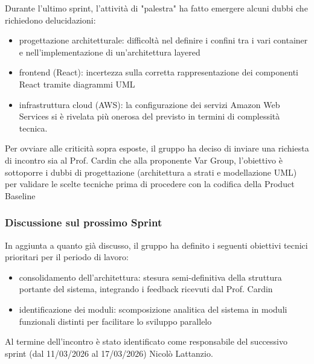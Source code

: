 \documentclass[a4paper, 11pt]{article}
\begin{document}
Durante l'ultimo sprint, l'attività di "palestra" ha fatto emergere alcuni dubbi che richiedono delucidazioni:
\begin{itemize}
    \item progettazione architetturale: difficoltà nel definire i confini tra i vari container e nell'implementazione di un'architettura layered 
    \item frontend (React): incertezza sulla corretta rappresentazione dei componenti React tramite diagrammi UML
    \item infrastruttura cloud (AWS): la configurazione dei servizi Amazon Web Services si è rivelata più onerosa del previsto in termini di complessità tecnica.
\end{itemize}

Per ovviare alle criticità sopra esposte, il gruppo ha deciso di inviare una richiesta di incontro sia al Prof. Cardin che alla proponente Var Group, l'obiettivo è sottoporre i dubbi di progettazione (architettura a strati e modellazione UML) per validare le scelte tecniche prima di procedere con la codifica della Product Baseline


\subsubsection{Discussione sul prossimo Sprint}
In aggiunta a quanto già discusso, il gruppo ha definito i seguenti obiettivi tecnici prioritari per il periodo di lavoro:
\begin{itemize}
    \item consolidamento dell'architettura: stesura semi-definitiva della struttura portante del sistema, integrando i feedback ricevuti dal Prof. Cardin
    \item identificazione dei moduli: scomposizione analitica del sistema in moduli funzionali distinti per facilitare lo sviluppo parallelo
\end{itemize}

Al termine dell'incontro è stato identificato come responsabile del successivo sprint (dal 11/03/2026 al 17/03/2026) Nicolò Lattanzio.

\end{document}
